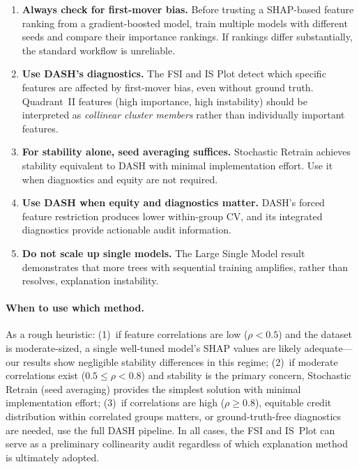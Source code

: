 \documentclass[11pt]{article}
\newcommand{\dash}{\textsc{DASH}}
\newcommand{\rhovar}{\rho}
\begin{document}
\begin{enumerate}
  \item \textbf{Always check for first-mover bias.} Before trusting a
    SHAP-based feature ranking from a gradient-boosted model, train
    multiple models with different seeds and compare their importance
    rankings. If rankings differ substantially, the standard workflow
    is unreliable.
  \item \textbf{Use \dash{}'s diagnostics.} The FSI and IS Plot detect
    which specific features are affected by first-mover bias, even
    without ground truth. Quadrant~II features (high importance, high
    instability) should be interpreted as \emph{collinear cluster
    members} rather than individually important features.
  \item \textbf{For stability alone, seed averaging suffices.}
    Stochastic Retrain achieves stability equivalent to \dash{} with
    minimal implementation effort. Use it when diagnostics and equity
    are not required.
  \item \textbf{Use \dash{} when equity and diagnostics matter.}
    \dash{}'s forced feature restriction produces lower within-group
    CV, and its integrated diagnostics provide actionable audit
    information.
  \item \textbf{Do not scale up single models.} The Large Single Model
    result demonstrates that more trees with sequential training
    amplifies, rather than resolves, explanation instability.
\end{enumerate}

\paragraph{When to use which method.}
As a rough heuristic:
(1)~if feature correlations are low ($\rhovar < 0.5$) and the dataset
is moderate-sized, a single well-tuned model's SHAP values are likely
adequate---our results show negligible stability differences in this
regime;
(2)~if moderate correlations exist ($0.5 \leq \rhovar < 0.8$) and
stability is the primary concern, Stochastic Retrain (seed averaging)
provides the simplest solution with minimal implementation effort;
(3)~if correlations are high ($\rhovar \geq 0.8$), equitable credit
distribution within correlated groups matters, or ground-truth-free
diagnostics are needed, use the full \dash{} pipeline.
In all cases, the FSI and IS~Plot can serve as a preliminary
collinearity audit regardless of which explanation method is ultimately
adopted.
\end{document}
